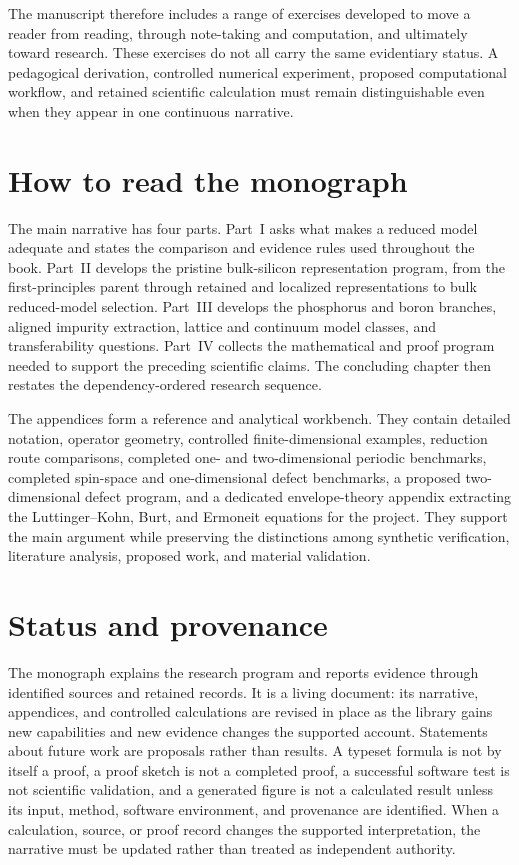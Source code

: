 The manuscript therefore includes a range of exercises developed to move a
reader from reading, through note-taking and computation, and ultimately toward
research. These exercises do not all carry the same evidentiary status. A
pedagogical derivation, controlled numerical experiment, proposed computational
workflow, and retained scientific calculation must remain distinguishable even
when they appear in one continuous narrative.

\section*{How to read the monograph}

The main narrative has four parts. Part~I asks what makes a reduced model
adequate and states the comparison and evidence rules used throughout the
book. Part~II develops the pristine bulk-silicon representation program, from
the first-principles parent through retained and localized representations to
bulk reduced-model selection. Part~III develops the phosphorus and boron
branches, aligned impurity extraction, lattice and continuum model classes,
and transferability questions. Part~IV collects the mathematical and proof
program needed to support the preceding scientific claims. The concluding
chapter then restates the dependency-ordered research sequence.

The appendices form a reference and analytical workbench. They contain detailed
notation, operator geometry, controlled finite-dimensional examples, reduction
route comparisons, completed one- and two-dimensional periodic benchmarks,
completed spin-space and one-dimensional defect benchmarks, a proposed
two-dimensional defect program, and a dedicated envelope-theory appendix
extracting the Luttinger--Kohn, Burt, and Ermoneit equations for the project.
They support the main argument while preserving the distinctions among
synthetic verification, literature analysis, proposed work, and material
validation.

\section*{Status and provenance}

The monograph explains the research program and reports evidence through
identified sources and retained records. It is a living document: its narrative,
appendices, and controlled calculations are revised in place as the library gains
new capabilities and new evidence changes the supported account. Statements about
future work are proposals rather than results. A typeset formula is not by itself
a proof, a proof sketch is not a completed proof, a successful software test is
not scientific validation, and a generated figure is not a calculated result
unless its input, method, software environment, and provenance are identified.
When a calculation, source, or proof record changes the supported interpretation,
the narrative must be updated rather than treated as independent authority.

